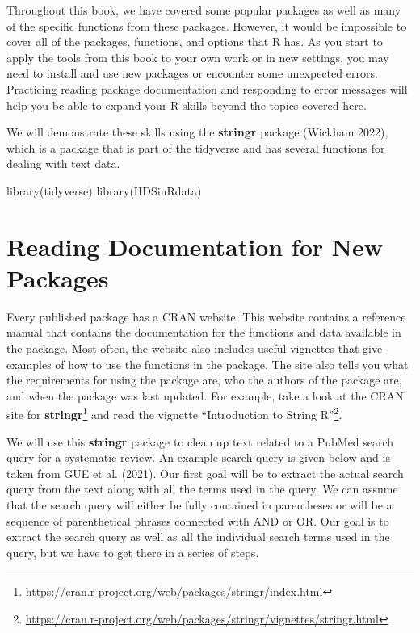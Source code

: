 \documentclass[
  letterpaper,
]{krantz}
\makeatletter
\newenvironment{Shaded}{\begin{snugshade}}{\end{snugshade}}
\newcommand{\FunctionTok}[1]{\textcolor[rgb]{0.28,0.35,0.67}{#1}}
\newcommand{\NormalTok}[1]{\textcolor[rgb]{0.00,0.23,0.31}{#1}}
\renewcommand{\href}[2]{#2\footnote{\url{#1}}}
\newenvironment{kframe}{%
\medskip{}
\setlength{\fboxsep}{.8em}
 \def\at@end@of@kframe{}%
 \ifinner\ifhmode%
  \def\at@end@of@kframe{\end{minipage}}%
  \begin{minipage}{\columnwidth}%
 \fi\fi%
 \def\FrameCommand##1{\hskip\@totalleftmargin \hskip-\fboxsep
 \colorbox{shadecolor}{##1}\hskip-\fboxsep
     \hskip-\linewidth \hskip-\@totalleftmargin \hskip\columnwidth}%
 \MakeFramed {\advance\hsize-\width
   \@totalleftmargin\z@ \linewidth\hsize
   \@setminipage}}%
 {\par\unskip\endMakeFramed%
 \at@end@of@kframe}
\renewenvironment{Shaded}{\begin{kframe}}{\end{kframe}}
\makeatother
\begin{document}
Throughout this book, we have covered some popular packages as well as
many of the specific functions from these packages. However, it would be
impossible to cover all of the packages, functions, and options that R
has. As you start to apply the tools from this book to your own work or
in new settings, you may need to install and use new packages or
encounter some unexpected errors. Practicing reading package
documentation and responding to error messages will help you be able to
expand your R skills beyond the topics covered here.

We will demonstrate these skills using the \textbf{stringr} package
(Wickham 2022), which is a package that is part of the tidyverse and has
several functions for dealing with text data.

\begin{Shaded}
\begin{Highlighting}[]
\FunctionTok{library}\NormalTok{(tidyverse)}
\FunctionTok{library}\NormalTok{(HDSinRdata)}
\end{Highlighting}
\end{Shaded}

\section{Reading Documentation for New
Packages}\label{reading-documentation-for-new-packages}

Every published package has a CRAN website. This website contains a
reference manual that contains the documentation for the functions and
data available in the package. Most often, the website also includes
useful vignettes that give examples of how to use the functions in the
package. The site also tells you what the requirements for using the
package are, who the authors of the package are, and when the package
was last updated. For example, take a look at the CRAN site for
\href{https://cran.r-project.org/web/packages/stringr/index.html}{\textbf{stringr}}
and read the vignette
\href{https://cran.r-project.org/web/packages/stringr/vignettes/stringr.html}{``Introduction
to String R''}.

We will use this \textbf{stringr} package to clean up text related to a
PubMed search query for a systematic review. An example search query is
given below and is taken from GUE et al. (2021). Our first goal will be
to extract the actual search query from the text along with all the
terms used in the query. We can assume that the search query will either
be fully contained in parentheses or will be a sequence of parenthetical
phrases connected with AND or OR. Our goal is to extract the search
query as well as all the individual search terms used in the query, but
we have to get there in a series of steps.
\end{document}
